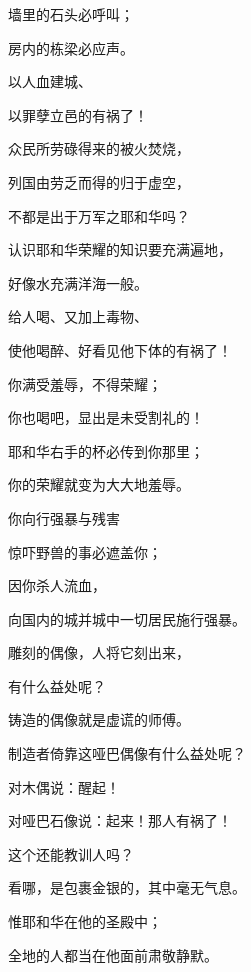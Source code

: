{\par }{\Q {}墙里的石头必呼叫；
\par }{\Q 房内的栋梁必应声。
\par }{\Q {}以人血建城、
\par }{\Q 以罪孽立邑的有祸了！
\par }{\Q {}众民所劳碌得来的被火焚烧，
\par }{\Q 列国由劳乏而得的归于虚空，
\par }{\Q 不都是出于万军之耶和华吗？
\par }{\Q {}认识耶和华荣耀的知识要充满遍地，
\par }{\Q 好像水充满洋海一般。
\par }{\BB \par }{\Q {}给人{}喝、又加上毒物、
\par }{\Q 使他喝醉、好看见他下体的有祸了！
\par }{\Q {}你满受羞辱，不得荣耀；
\par }{\Q 你也喝吧，显出是未受割礼的！
\par }{\Q 耶和华右手的杯必传到你那里；
\par }{\Q 你的荣耀就变为大大地羞辱。
\par }{\Q {}你向{}行强暴与残害
\par }{\Q 惊吓野兽的事必遮盖你；
\par }{\Q 因你杀人流血，
\par }{\Q 向国内的城并城中一切居民施行强暴。
\par }{\BB \par }{\Q {}雕刻的偶像，人将它刻出来，
\par }{\Q 有什么益处呢？
\par }{\Q 铸造的偶像就是虚谎的师傅。
\par }{\Q 制造者倚靠这哑巴偶像有什么益处呢？
\par }{\Q {}对木偶说：醒起！
\par }{\Q 对哑巴石像说：起来！那人有祸了！
\par }{\Q 这个还能教训人吗？
\par }{\Q 看哪，是包裹金银的，其中毫无气息。
\par }{\BB \par }{\Q {}惟耶和华在他的圣殿中；
\par }{\Q 全地的人都当在他面前肃敬静默。

\par }
